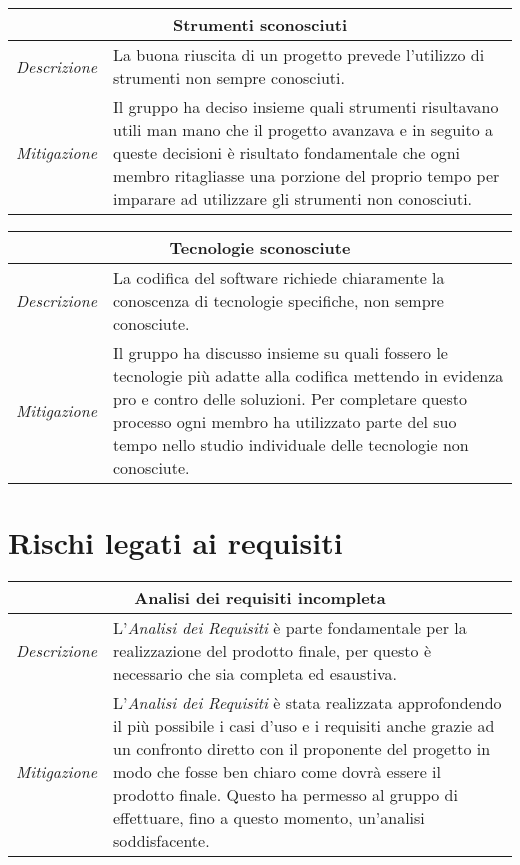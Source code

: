 \begin{table}[H]
    \centering
    \begin{tabular}{|p{2cm}|p{10cm}|}
    \hline
    \multicolumn{2}{|c|}{\textbf{Strumenti sconosciuti}} \\ \hline
    \multicolumn{1}{|l|}{\textit{Descrizione}} & La buona riuscita di un progetto prevede l'utilizzo di strumenti non sempre conosciuti. \\ \hline
    \multicolumn{1}{|l|}{\textit{Mitigazione}} & Il gruppo ha deciso insieme quali strumenti risultavano utili man mano che il progetto avanzava e in seguito a queste decisioni è risultato fondamentale che ogni membro ritagliasse una porzione del proprio tempo per imparare ad utilizzare gli strumenti non conosciuti. \\ \hline
    \end{tabular}
\end{table}

\begin{table}[H]
    \centering
    \begin{tabular}{|p{2cm}|p{10cm}|}
    \hline
    \multicolumn{2}{|c|}{\textbf{Tecnologie sconosciute}} \\ \hline
    \multicolumn{1}{|l|}{\textit{Descrizione}} & La codifica del software richiede chiaramente la conoscenza di tecnologie specifiche, non sempre conosciute. \\ \hline
    \multicolumn{1}{|l|}{\textit{Mitigazione}} & Il gruppo ha discusso insieme su quali fossero le tecnologie più adatte alla codifica mettendo in evidenza pro e contro delle soluzioni. Per completare questo processo ogni membro ha utilizzato parte del suo tempo nello studio individuale delle tecnologie non conosciute. \\ \hline
    \end{tabular}
\end{table}



\section{Rischi legati ai requisiti}

\begin{table}[H]
    \centering
    \begin{tabular}{|p{2cm}|p{10cm}|}
    \hline
    \multicolumn{2}{|c|}{\textbf{Analisi dei requisiti incompleta}} \\ \hline
    \multicolumn{1}{|l|}{\textit{Descrizione}} & L'\textit{Analisi dei Requisiti} è parte fondamentale per la realizzazione del prodotto finale, per questo è necessario che sia completa ed esaustiva. \\ \hline
    \multicolumn{1}{|l|}{\textit{Mitigazione}} & L'\textit{Analisi dei Requisiti} è stata realizzata approfondendo il più possibile i casi d'uso e i requisiti anche grazie ad un confronto diretto con il proponente del progetto in modo che fosse ben chiaro come dovrà essere il prodotto finale. Questo ha permesso al gruppo di effettuare, fino a questo momento, un'analisi soddisfacente. \\ \hline
    \end{tabular}
\end{table}
